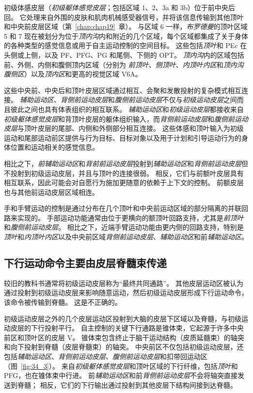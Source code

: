 初级体感皮层（\textit{初级躯体感觉皮层}；包括区域 1、2、3a 和 3b）位于前中央后回。
它处理来自外围的皮肤和肌肉机械感受器信号，并将该信息传输到其他顶叶和中央前皮层区域（第~\ref{chap:chap19}~章）。
与区域 6 一样，\textit{布罗德曼}的顶叶区域 5 和 7 现在被划分为位于\textit{顶内沟}内和附近的几个区域，每个区域都集成了关于身体的各种类型的感觉信息或用于自主运动控制的空间目标。
这些包括\textit{顶叶}和 PEc 在头侧或上侧，以及 PF、PFG、PG 和尾侧、下侧的 OPT。
\textit{顶内沟}内的区域包括前、外侧、内侧和腹侧顶内区域（分别为 \textit{前顶叶}、\textit{侧顶叶}、\textit{内顶叶内区}和\textit{顶内沟腹侧区}）以及\textit{顶内区}和更高的视觉区域 V6A。


这些中央前、中央后和顶叶皮层区域通过相互、会聚和发散投射的复杂模式相互连接。
\textit{辅助运动区}、\textit{背侧前运动皮层}和\textit{腹侧前运动皮层}不仅与\textit{初级运动皮层}之间而且彼此之间也具有体表组织的相互联系。
\textit{辅助运动区}和\textit{初级运动皮层}都接收来自\textit{初级躯体感觉皮层}和背顶叶皮层的躯体组织输入，而\textit{背侧前运动皮层}和\textit{腹侧前运动皮层}与顶叶皮层的尾部、内侧和外侧部分相互连接。
这些体感和顶叶输入为初级运动和尾部运动前区提供与行为目标、目标对象以及用于计划和引导运动行为的身体位置和运动相关的感觉信息。


相比之下，\textit{前辅助运动区}和\textit{背前前运动皮层}投射到\textit{辅助运动区}和\textit{背侧前运动皮层}但不投射到初级运动皮层，并且与顶叶的连接很弱。
相反，它们与前额叶皮层具有相互联系，因此可能会对自愿行为施加更随意的依赖于上下文的控制。
前额皮层也与其他前运动皮层区域相连。


手和手臂运动的控制是通过分布在几个顶叶和中央前运动区域的部分隔离的并联回路来实现的。
手部运动功能通常由位于更横向的额顶叶回路支持，尤其是\textit{前顶叶}和\textit{腹侧前运动皮层}。
相比之下，近端手臂运动功能由更内侧的回路支持，特别是\textit{顶叶}和\textit{内顶叶内区}以及中央前区域\textit{背侧前运动皮层}、\textit{辅助运动区}和前\textit{辅助运动区}。



\subsection{下行运动命令主要由皮层脊髓束传递}

较旧的教科书通常将初级运动皮层称为“最终共同通路”。
其他皮层运动区被认为通过投射到初级运动皮层来影响随意运动，然后初级运动皮层形成下行运动命令，该命令被传输到脊髓。
这是不正确的。


初级运动皮层之外的几个皮层运动区投射到大脑的皮层下区域以及脊髓，与初级运动皮层的下行投射平行。
自主控制的关键下行通路是锥体束，它起源于许多中央前区和顶叶区的皮层 V。
锥体束包含终止于脑干运动结构（皮质延髓束）的轴突和向下投射到脊髓（皮层脊髓束）的轴突。
中央前区不仅包括初级运动皮层，还包括\textit{辅助运动区}、\textit{背侧前运动皮层}、\textit{腹侧前运动皮层}和扣带回运动区（图~\ref{fig:34_3}）。
来自\textit{初级躯体感觉皮层}和顶叶区域的下行纤维，包括\textit{顶叶}和 PFG，也在锥体束中行进。
前\textit{辅助运动区}和前\textit{背侧前运动皮层}不会将轴突直接发送到脊髓；
相反，它们的下行输出通过投射到其他皮层下结构间接到达脊髓。


